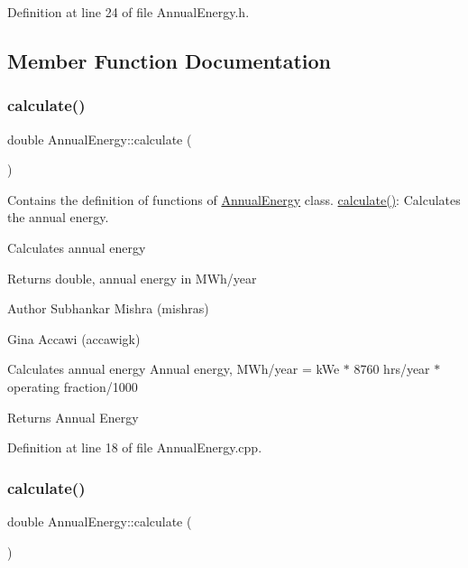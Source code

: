 Definition at line 24 of file Annual\+Energy.\+h.



\subsection{Member Function Documentation}
\mbox{\label{class_annual_energy_ab599860ffb32ce20a1042a3e9d2ad57f}} 
\subsubsection{\texorpdfstring{calculate()}{calculate()}\hspace{0.1cm}{\footnotesize\ttfamily [1/3]}}
{\footnotesize\ttfamily double Annual\+Energy\+::calculate (\begin{DoxyParamCaption}{ }\end{DoxyParamCaption})}



Contains the definition of functions of \hyperlink{class_annual_energy}{Annual\+Energy} class. \hyperlink{class_annual_energy_ab599860ffb32ce20a1042a3e9d2ad57f}{calculate()}\+: Calculates the annual energy. 

Calculates annual energy \begin{DoxyReturn}{Returns}
double, annual energy in M\+Wh/year
\end{DoxyReturn}
\begin{DoxyAuthor}{Author}
Subhankar Mishra (mishras) 

Gina Accawi (accawigk) 
\end{DoxyAuthor}
Calculates annual energy Annual energy, M\+Wh/year = k\+We $\ast$ 8760 hrs/year $\ast$ operating fraction/1000 \begin{DoxyReturn}{Returns}
Annual Energy 
\end{DoxyReturn}


Definition at line 18 of file Annual\+Energy.\+cpp.

\mbox{\label{class_annual_energy_ab599860ffb32ce20a1042a3e9d2ad57f}} 
\subsubsection{\texorpdfstring{calculate()}{calculate()}\hspace{0.1cm}{\footnotesize\ttfamily [2/3]}}
{\footnotesize\ttfamily double Annual\+Energy\+::calculate (\begin{DoxyParamCaption}{ }\end{DoxyParamCaption})}

